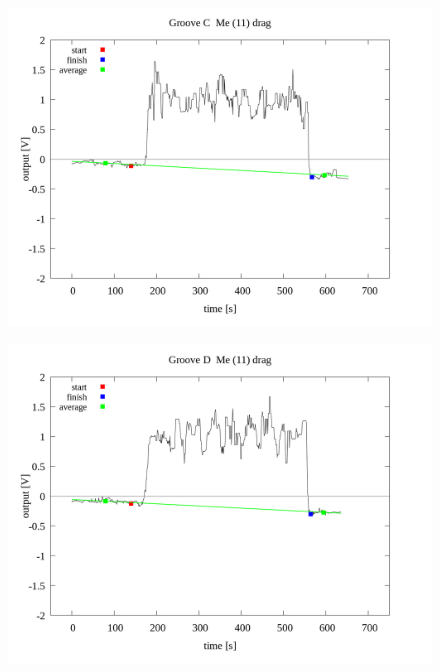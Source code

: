 \documentclass[a4paper]{jsarticle}
\begin{document}
\begin{figure}[htbp]
    \footnotesize
    \begin{center}
        \includegraphics[width=140mm]{../../../../33_result/210806/median/11/drag/03/Groove_C_me(11)_drag_03.png}
    \end{center}
\end{figure}

\begin{figure}[htbp]
    \footnotesize
    \begin{center}
        \includegraphics[width=140mm]{../../../../33_result/210806/median/11/drag/03/Groove_D_me(11)_drag_03.png}
    \end{center}
\end{figure}
\end{document}

